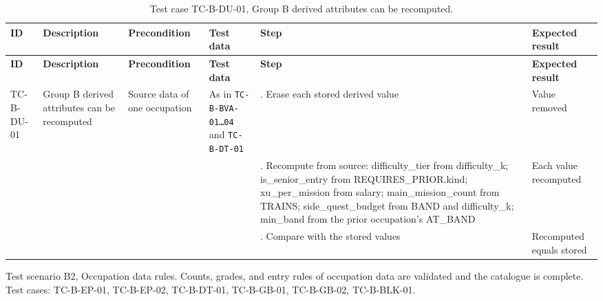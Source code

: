 {\footnotesize{}\renewcommand{\arraystretch}{1.1}
\begin{longtable}{|>{\raggedright\arraybackslash}p{}|>{\raggedright\arraybackslash}p{}|>{\raggedright\arraybackslash}p{}|>{\raggedright\arraybackslash}p{}|>{\raggedright\arraybackslash}p{}|>{\raggedright\arraybackslash}p{}|}
\caption{Test case TC-B-DU-01, Group B derived attributes can be recomputed.} \\
\hline
\textbf{ID} & \textbf{Description} & \textbf{Precondition} & \textbf{Test data} & \textbf{Step} & \textbf{Expected result} \\ \hline
\endfirsthead
\hline
\textbf{ID} & \textbf{Description} & \textbf{Precondition} & \textbf{Test data} & \textbf{Step} & \textbf{Expected result} \\ \hline
\endhead
TC-B-DU-01 & Group B derived attributes can be recomputed & Source data of one occupation & As in \texttt{TC-\allowbreak{}B-\allowbreak{}BVA-\allowbreak{}01…04} and \texttt{TC-\allowbreak{}B-\allowbreak{}DT-\allowbreak{}01} & 1. Erase each stored derived value & Value removed \\ \cline{5-6}
 &  &  &  & 2. Recompute from source: difficulty\_\allowbreak{}tier from difficulty\_\allowbreak{}k; is\_\allowbreak{}senior\_\allowbreak{}entry from REQUIRES\_\allowbreak{}PRIOR.\allowbreak{}kind; xu\_\allowbreak{}per\_\allowbreak{}mission from salary; main\_\allowbreak{}mission\_\allowbreak{}count from TRAINS; side\_\allowbreak{}quest\_\allowbreak{}budget from BAND and difficulty\_\allowbreak{}k; min\_band from the prior occupation's AT\_BAND & Each value recomputed \\ \cline{5-6}
 &  &  &  & 3. Compare with the stored values & Recomputed equals stored \\ \hline
\end{longtable}
}

Test scenario B2, Occupation data rules. Counts, grades, and entry rules of occupation data are validated and the catalogue is complete. Test cases: TC-B-EP-01, TC-B-EP-02, TC-B-DT-01, TC-B-GB-01, TC-B-GB-02, TC-\allowbreak{}B-\allowbreak{}BLK-\allowbreak{}01.

